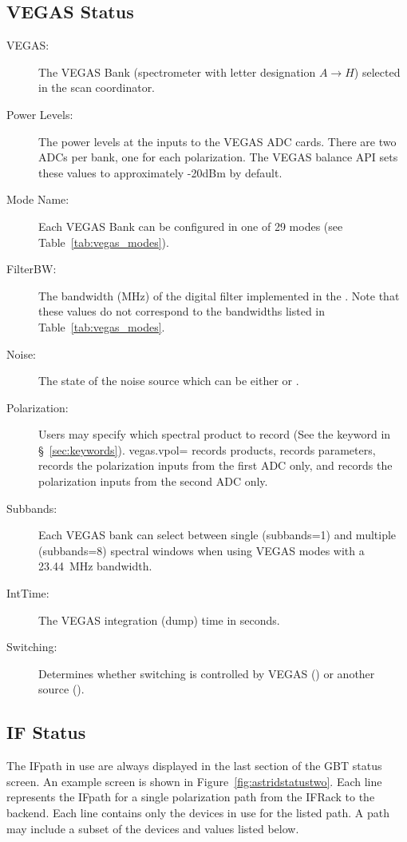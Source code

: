 \subsection{VEGAS Status}
\begin{description}
\item[VEGAS:] The \gls{VEGAS} Bank (spectrometer with letter designation $A \rightarrow H$)
selected in the scan coordinator.
\item[Power Levels:] The power levels at the inputs to the \gls{VEGAS} \gls{ADC} cards.
There are two \glspl{ADC} per bank, one for each polarization. The \gls{VEGAS} balance
\gls{API} sets these values to approximately -20dBm by default.
\item[Mode Name:] Each \gls{VEGAS} Bank can be configured in one of 29 modes (see
Table~\ref{tab:vegas_modes}).
\item[FilterBW:] The bandwidth (MHz) of the digital filter implemented in the
.  Note that these values do not correspond to the
bandwidths listed in Table~\ref{tab:vegas_modes}.
\item[Noise:] The state of the noise source which can be either  or .
\item[Polarization:] Users may specify which spectral product to record (See the 
keyword in \S~\ref{sec:keywords}).  vegas.vpol= records  products,
 records  parameters,  records the polarization inputs
from the first \gls{ADC} only, and  records the polarization inputs from the second
\gls{ADC} only.
\item[Subbands:] Each \gls{VEGAS} bank can select between single (subbands=1) and multiple
(subbands=8) spectral windows when using VEGAS modes with a 23.44~MHz bandwidth.  
\item[IntTime:] The \gls{VEGAS} integration (dump) time in seconds.
\item[Switching:] Determines whether switching is controlled by \gls{VEGAS} () or
another source ().

\end{description}

\subsection{IF Status}

The \gls{IFpath} in use are always displayed in the last section of the \gls{GBT}
status screen.  An example screen is shown in Figure~\ref{fig:astridstatustwo}.
Each line represents the \gls{IFpath} for a single polarization path from the 
\gls{IFRack} to the backend.  Each line contains only the devices in use for the 
listed path. A path may include a subset of the devices and values listed 
below.

